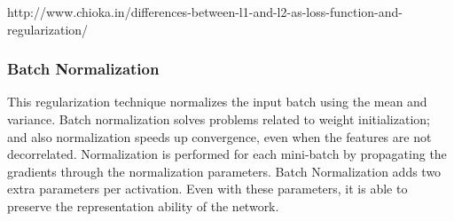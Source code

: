 http://www.chioka.in/differences-between-l1-and-l2-as-loss-function-and-regularization/

\subsubsection{Batch Normalization}
This regularization technique normalizes the input batch using the mean and variance. Batch normalization solves problems related to weight initialization; and also normalization speeds up convergence, even when the features are not decorrelated. Normalization is performed for each mini-batch by propagating the gradients through the normalization parameters. Batch Normalization adds two extra parameters per activation. Even with these parameters, it is able to preserve the representation ability of the network. \cite{Choromanska2015BatchShift}